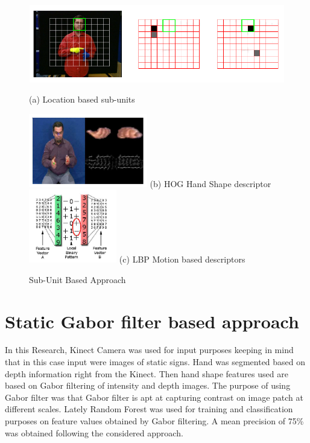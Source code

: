 \begin{figure}[!htb]
	
	\caption{Sub-Unit Based Approach }\label{fig:image1}
	\includegraphics[height=3.4cm, width=15cm]{ThesisFigs/image1.png}
	
	\centering (a) Location based sub-units 
	
	\endminipage\hfill
	\includegraphics[height=3.2cm, width=\linewidth]{ThesisFigs/image2.png}
	(b) HOG Hand Shape descriptor
	\endminipage\hfill
	\includegraphics[height=3.2cm,width=\linewidth]{ThesisFigs/image3.png}
	(c) LBP Motion based descriptors 
	\endminipage\hfill
	
\end{figure}


\section{Static Gabor filter based approach}
 In this Research, Kinect Camera was used for input purposes keeping in mind that in this case input were images of static signs. Hand was segmented based on depth information right from the Kinect. Then hand shape features used are based on Gabor filtering of intensity and depth images. The purpose of using Gabor filter was that Gabor filter is apt at capturing contrast on image patch at different scales. Lately Random Forest was used for training and classification purposes on feature values obtained by Gabor filtering. A mean precision of 75\% was obtained following the considered approach.\cite{no2}

